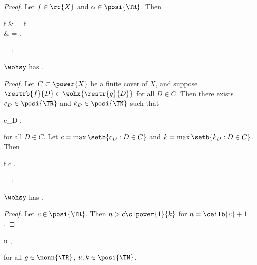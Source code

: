 \documentclass[b5paper, english, oneside]{memoir}
\begin{document}
\begin{proof}
Let $f \in \rc{X}$ and $\alpha \in \posi{\TR}$. Then
\begin{eqs}
f & =  \alpha f \\
{} & =  .
\end{eqs}
\end{proof}

\begin{theorem}
\label{PowerLocality}
$\wohsy$ has .
\end{theorem}

\begin{proof}
Let $C \subset \power{X}$ be a finite cover of $X$, and suppose $\restrb{f}{D} \in \wohx{\restr{g}{D}}$ for all $D \in C$. Then there exists $c_D \in \posi{\TR}$ and $k_D \in \posi{\TN}$ such that
\begin{eqs}
 \leq c_D ,
\end{eqs}
for all $D \in C$. Let $c = \max \setb{c_D : D \in C}$ and $k = \max \setb{k_D : D \in C}$. Then
\begin{eqs}
f \leq c .
\end{eqs}
\end{proof}

\begin{theorem}
\label{PowerOneSeparation}
$\wohsy$ has .
\end{theorem}

\begin{proof}
Let $c \in \posi{\TR}$. Then $n > c \clpower{1}{k}$ for $n = \ceilb{c} + 1$. 
\end{proof}

\begin{lemma}
\label{ClampedPowerLemma}
\begin{eqs}
u \leq {},
\end{eqs}
for all $g \in \nonn{\TR}$, $u, k \in \posi{\TN}$.
\end{lemma}
\end{document}
